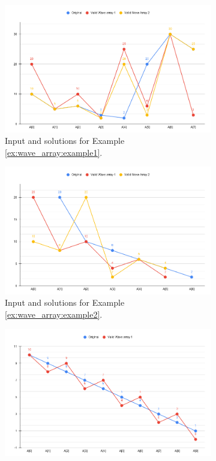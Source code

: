 \begin{figure}
	\centering
	\begin{subfigure}[t]{0.80\textwidth}
		\includegraphics[width=1\linewidth]{sources/wave_array/images/example1.png}
		\caption{Input and solutions for Example \ref{ex:wave_array:example1}.}
		\label{fig:wave_array:example1}
	 \end{subfigure}
	\hfill
	\begin{subfigure}[t]{0.80\textwidth}
		\includegraphics[width=1\linewidth]{sources/wave_array/images/example2.png}
		\caption{Input and solutions for Example \ref{ex:wave_array:example2}.}
		\label{fig:wave_array:example2}
	 \end{subfigure}
	 \hfill
	 \begin{subfigure}[t]{0.80\textwidth}
		 \includegraphics[width=1\linewidth]{sources/wave_array/images/example3.png}

\end{subfigure}
\end{figure}
